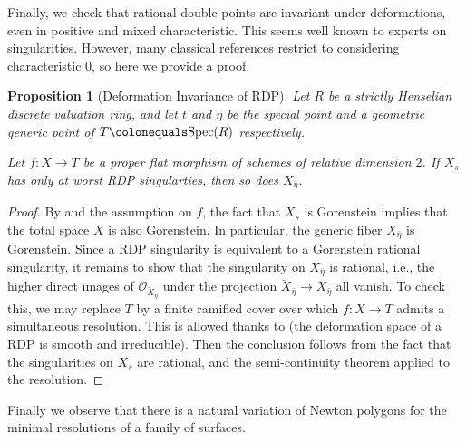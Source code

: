 \documentclass[11pt, letterpaper]{amsart}
\theoremstyle{plain}
\newtheorem{proposition}[theorem]{Proposition}
\theoremstyle{definition}
\newcommand{\Spec}{\mathrm{Spec}}
\newcommand{\<}{\langle}
\renewcommand{\>}{\rangle}
\newcommand{\sO}{\mathcal{O}}
\begin{document}
Finally, we check that rational double points are invariant under deformations, even in positive and mixed characteristic. This seems well known to experts on singularities. However, many classical references restrict to considering characteristic $0$, so here we provide a proof.
\begin{proposition}[Deformation Invariance of RDP]
\label{prop: def RDP}
    Let $R$ be a strictly Henselian discrete valuation ring, and let $t$ and $\bar{\eta}$ be the special point and a geometric generic point of $T \colonequals \Spec(R)$ respectively. 
    
    Let $f : X \to T$ be a proper flat morphism of schemes of relative dimension $2$. 
    If $X_s$ has only at worst RDP singularties, then so does $X_{\bar{\eta}}$. 
\end{proposition}
\begin{proof}
    By \cite[\href{https://stacks.math.columbia.edu/tag/0BJJ}{Tag 0BJJ}]{stacks-project} and the assumption on $f$, the fact that $X_s$ is Gorenstein implies that the total space $X$ is also Gorenstein.
    In particular, the generic fiber $X_{\bar{\eta}}$ is Gorenstein. 
    Since a RDP singularity is equivalent to a Gorenstein rational singularity, it remains to show that the singularity on $X_{\bar{\eta}}$ is rational, i.e., the higher direct images of $\sO_{\breve{X}_{\bar{\eta}}}$ under the projection $\breve{X}_{\bar{\eta}} \to X_{\bar{\eta}}$ all vanish. To check this, we may replace $T$ by a finite ramified cover over which $f : X \to T$ admits a simultaneous resolution. This is allowed thanks to \cite[Thm.\ 3]{Artin-Res} (the deformation space of a RDP is smooth and irreducible). 
    Then the conclusion follows from the fact that the singularities on $X_s$ are rational, and the semi-continuity theorem applied to the resolution. 
\end{proof}

Finally we observe that there is a natural variation of Newton polygons for the minimal resolutions of a family of surfaces.
\end{document}
